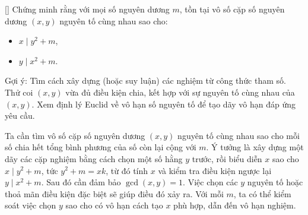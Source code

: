 \documentclass[../04-diophantine-equations.tex]{subfiles}
\begin{document}
\begin{exercise*}\label{example:BGR-2015-EGMO-TST-P4}[\textbf{}]
	\footnotemark Chứng minh rằng với mọi số nguyên dương \( m \), tồn tại vô số cặp số nguyên dương \( (x, y) \) nguyên tố cùng nhau sao cho:
	\begin{itemize}[topsep=0pt, partopsep=0pt, itemsep=0pt]
		\item \( x \mid y^2 + m \),
		\item \( y \mid x^2 + m \).
	\end{itemize}
\end{exercise*}

\begin{remark*}
	Gợi ý: Tìm cách xây dựng (hoặc suy luận) các nghiệm từ công thức tham số.  
	Thử coi \((x,y)\) vừa đủ điều kiện chia, kết hợp với sự nguyên tố cùng nhau của \((x,y)\).  
	Xem định lý Euclid về vô hạn số nguyên tố để tạo dãy vô hạn đáp ứng yêu cầu.
\end{remark*}

\begin{story*}
    Ta cần tìm vô số cặp số nguyên dương \( (x, y) \) nguyên tố cùng nhau sao cho mỗi số chia hết tổng bình phương của số còn lại cộng với \( m \).  
    Ý tưởng là xây dựng một dãy các cặp nghiệm bằng cách chọn một số hằng \( y \) trước, rồi biểu diễn \( x \) sao cho \( x \mid y^2 + m \), tức \( y^2 + m = xk \), từ đó tính \( x \) và kiểm tra điều kiện ngược lại \( y \mid x^2 + m \).  
    Sau đó cần đảm bảo \( \gcd(x, y) = 1 \). Việc chọn các \( y \) nguyên tố hoặc thoả mãn điều kiện đặc biệt sẽ giúp điều đó xảy ra.  
    Với mỗi \( m \), ta có thể kiểm soát việc chọn \( y \) sao cho có vô hạn cách tạo \( x \) phù hợp, dẫn đến vô hạn nghiệm.
\end{story*}

\end{document}
